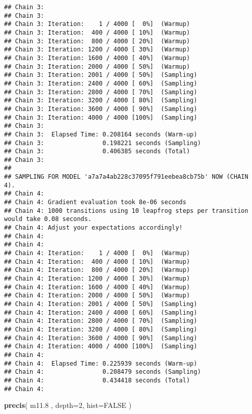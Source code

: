 \documentclass[]{article}
\newenvironment{Shaded}{\begin{snugshade}}{\end{snugshade}}
\newcommand{\KeywordTok}[1]{\textcolor[rgb]{0.13,0.29,0.53}{\textbf{{#1}}}}
\newcommand{\DataTypeTok}[1]{\textcolor[rgb]{0.13,0.29,0.53}{{#1}}}
\newcommand{\DecValTok}[1]{\textcolor[rgb]{0.00,0.00,0.81}{{#1}}}
\newcommand{\FloatTok}[1]{\textcolor[rgb]{0.00,0.00,0.81}{{#1}}}
\newcommand{\OtherTok}[1]{\textcolor[rgb]{0.56,0.35,0.01}{{#1}}}
\newcommand{\NormalTok}[1]{{#1}}
\begin{document}
\begin{verbatim}
## Chain 3: 
## Chain 3: 
## Chain 3: Iteration:    1 / 4000 [  0%]  (Warmup)
## Chain 3: Iteration:  400 / 4000 [ 10%]  (Warmup)
## Chain 3: Iteration:  800 / 4000 [ 20%]  (Warmup)
## Chain 3: Iteration: 1200 / 4000 [ 30%]  (Warmup)
## Chain 3: Iteration: 1600 / 4000 [ 40%]  (Warmup)
## Chain 3: Iteration: 2000 / 4000 [ 50%]  (Warmup)
## Chain 3: Iteration: 2001 / 4000 [ 50%]  (Sampling)
## Chain 3: Iteration: 2400 / 4000 [ 60%]  (Sampling)
## Chain 3: Iteration: 2800 / 4000 [ 70%]  (Sampling)
## Chain 3: Iteration: 3200 / 4000 [ 80%]  (Sampling)
## Chain 3: Iteration: 3600 / 4000 [ 90%]  (Sampling)
## Chain 3: Iteration: 4000 / 4000 [100%]  (Sampling)
## Chain 3: 
## Chain 3:  Elapsed Time: 0.208164 seconds (Warm-up)
## Chain 3:                0.198221 seconds (Sampling)
## Chain 3:                0.406385 seconds (Total)
## Chain 3: 
## 
## SAMPLING FOR MODEL 'a7a7a4ab228c37095f791eebea8cb75b' NOW (CHAIN 4).
## Chain 4: 
## Chain 4: Gradient evaluation took 8e-06 seconds
## Chain 4: 1000 transitions using 10 leapfrog steps per transition would take 0.08 seconds.
## Chain 4: Adjust your expectations accordingly!
## Chain 4: 
## Chain 4: 
## Chain 4: Iteration:    1 / 4000 [  0%]  (Warmup)
## Chain 4: Iteration:  400 / 4000 [ 10%]  (Warmup)
## Chain 4: Iteration:  800 / 4000 [ 20%]  (Warmup)
## Chain 4: Iteration: 1200 / 4000 [ 30%]  (Warmup)
## Chain 4: Iteration: 1600 / 4000 [ 40%]  (Warmup)
## Chain 4: Iteration: 2000 / 4000 [ 50%]  (Warmup)
## Chain 4: Iteration: 2001 / 4000 [ 50%]  (Sampling)
## Chain 4: Iteration: 2400 / 4000 [ 60%]  (Sampling)
## Chain 4: Iteration: 2800 / 4000 [ 70%]  (Sampling)
## Chain 4: Iteration: 3200 / 4000 [ 80%]  (Sampling)
## Chain 4: Iteration: 3600 / 4000 [ 90%]  (Sampling)
## Chain 4: Iteration: 4000 / 4000 [100%]  (Sampling)
## Chain 4: 
## Chain 4:  Elapsed Time: 0.225939 seconds (Warm-up)
## Chain 4:                0.208479 seconds (Sampling)
## Chain 4:                0.434418 seconds (Total)
## Chain 4:
\end{verbatim}

\begin{Shaded}
\begin{Highlighting}[]
\KeywordTok{precis}\NormalTok{( m11}\FloatTok{.8} \NormalTok{, }\DataTypeTok{depth=}\DecValTok{2}\NormalTok{, }\DataTypeTok{hist=}\OtherTok{FALSE} \NormalTok{)}
\end{Highlighting}
\end{Shaded}
\end{document}
